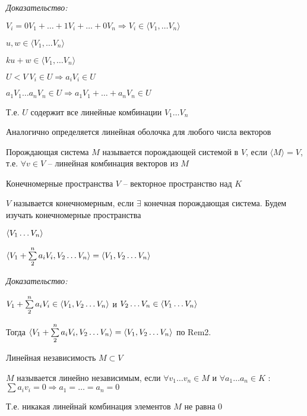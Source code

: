 \documentclass[12pt]{article}
\begin{document}
\textit{Доказательство:}

$V_i = 0 V_1 + \ldots + 1V_i + \ldots + 0V_n \Rightarrow V_i \in \langle V_1, \ldots V_n \rangle$

$u, w \in \langle V_1, \ldots V_n \rangle$

$ku + w \in \langle V_1, \ldots V_n \rangle$

\vspace{2mm}

$U < V\ V_i \in U \Rightarrow a_iV_i \in U$

$a_1V_1 \ldots a_nV_n \in U \Rightarrow a_1V_1 + \ldots + a_nV_n \in U$

Т.е. $U$ содержит все линейные комбинации $V_1 \ldots V_n$

\begin{Remark}{}
    Аналогично определяется линейная оболочка для любого числа векторов
\end{Remark}

\begin{defin}{Порождающая система}
    $M$ называется порождающей системой в $V$, если $\langle M \rangle = V$, т.е. $\forall v \in V$ -- линейная комбинация векторов из $M$
\end{defin}

\begin{defin}{Конечномерные пространства}
    $V$ -- векторное пространство над $K$

    $V$ называется конечномерным, если $\exists$ конечная порождающая система. Будем изучать конечномерные пространства
\end{defin}

\begin{lem}{}
    $\langle V_1 \ldots V_n \rangle$

    $\langle V_1 + \sum\limits_2^n a_iV_i, V_2 \ldots V_n \rangle = \langle V_1, V_2 \ldots V_n \rangle$
\end{lem}

\textit{Доказательство:}

$V_1 + \sum\limits_2^n a_iV_i \in \langle V_1, V_2 \ldots V_n \rangle$ и $V_2 \ldots V_n \in \langle V_1 \ldots V_n \rangle$

Тогда $\langle V_1 + \sum\limits_2^n a_iV_i, V_2 \ldots V_n \rangle = \langle V_1, V_2 \ldots V_n \rangle$ по Rem2.

\begin{defin}{Линейная независимость}
    $M \subset V$

    $M$ называется линейно независимым, если $\forall v_1 \ldots v_n \in M$ и $\forall a_1 \ldots a_n \in K$ : $\sum a_iv_i = 0 \Rightarrow a_1 = \ldots = a_n = 0$

    Т.е. никакая линейнай комбинация элементов $M$ не равна 0
\end{defin}
\end{document}
